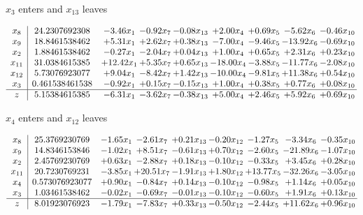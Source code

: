 \documentclass[9pt]{article}
\begin{document}
 $ x_{3} $ enters and $ x_{13} $ leaves 

 \[\begin{array}{c| c c@{\hskip 2pt} c@{\hskip 2pt} c@{\hskip 2pt} c@{\hskip 2pt} c@{\hskip 2pt} c@{\hskip 2pt} c@{\hskip 2pt} }
 x_{8}   &  24.2307692308 & -3.46 x_{1} & -0.92 x_{7} & -0.08 x_{13} & +  2.00 x_{4} & +  0.69 x_{5} & -5.62 x_{6} & -0.46 x_{10}\\
 x_{9}   &  18.8461538462 & +  5.31 x_{1} & +  2.62 x_{7} & +  0.38 x_{13} & -7.00 x_{4} & -9.46 x_{5} & -13.92 x_{6} & -0.69 x_{10}\\
 x_{2}   &  1.88461538462 & -0.27 x_{1} & -2.04 x_{7} & +  0.04 x_{13} & +  1.00 x_{4} & +  0.65 x_{5} & +  2.31 x_{6} & +  0.23 x_{10}\\
 x_{11}   &  31.0384615385 & + 12.42 x_{1} & +  5.35 x_{7} & +  0.65 x_{13} & -18.00 x_{4} & -3.88 x_{5} & -11.77 x_{6} & -2.08 x_{10}\\
 x_{12}   &  5.73076923077 & +  9.04 x_{1} & -8.42 x_{7} & +  1.42 x_{13} & -10.00 x_{4} & -9.81 x_{5} & + 11.38 x_{6} & +  0.54 x_{10}\\
 x_{3}   &  0.461538461538 & -0.92 x_{1} & +  0.15 x_{7} & -0.15 x_{13} & +  1.00 x_{4} & +  0.38 x_{5} & +  0.77 x_{6} & +  0.08 x_{10}\\
\hline
z    &  5.15384615385 & -6.31 x_{1} & -3.62 x_{7} & -0.38 x_{13} & +  5.00 x_{4} & +  2.46 x_{5} & +  5.92 x_{6} & +  0.69 x_{10}\\
\end{array}\]


 $ x_{4} $ enters and $ x_{12} $ leaves 

 \[\begin{array}{c| c c@{\hskip 2pt} c@{\hskip 2pt} c@{\hskip 2pt} c@{\hskip 2pt} c@{\hskip 2pt} c@{\hskip 2pt} c@{\hskip 2pt} }
 x_{8}   &  25.3769230769 & -1.65 x_{1} & -2.61 x_{7} & +  0.21 x_{13} & -0.20 x_{12} & -1.27 x_{5} & -3.34 x_{6} & -0.35 x_{10}\\
 x_{9}   &  14.8346153846 & -1.02 x_{1} & +  8.51 x_{7} & -0.61 x_{13} & +  0.70 x_{12} & -2.60 x_{5} & -21.89 x_{6} & -1.07 x_{10}\\
 x_{2}   &  2.45769230769 & +  0.63 x_{1} & -2.88 x_{7} & +  0.18 x_{13} & -0.10 x_{12} & -0.33 x_{5} & +  3.45 x_{6} & +  0.28 x_{10}\\
 x_{11}   &  20.7230769231 & -3.85 x_{1} & + 20.51 x_{7} & -1.91 x_{13} & +  1.80 x_{12} & + 13.77 x_{5} & -32.26 x_{6} & -3.05 x_{10}\\
 x_{4}   &  0.573076923077 & +  0.90 x_{1} & -0.84 x_{7} & +  0.14 x_{13} & -0.10 x_{12} & -0.98 x_{5} & +  1.14 x_{6} & +  0.05 x_{10}\\
 x_{3}   &  1.03461538462 & -0.02 x_{1} & -0.69 x_{7} & -0.01 x_{13} & -0.10 x_{12} & -0.60 x_{5} & +  1.91 x_{6} & +  0.13 x_{10}\\
\hline
z    &  8.01923076923 & -1.79 x_{1} & -7.83 x_{7} & +  0.33 x_{13} & -0.50 x_{12} & -2.44 x_{5} & + 11.62 x_{6} & +  0.96 x_{10}\\
\end{array}\]
\end{document}
